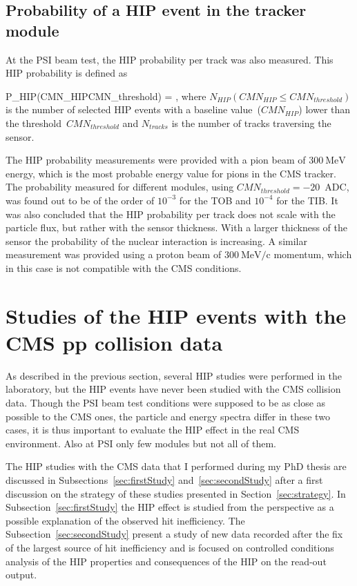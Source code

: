 \subsection{Probability of a HIP event in the tracker module~\label{sec:ProbPast}}

At the PSI beam test, the HIP probability per track was also measured. This HIP probability is defined as 

{
P_{HIP}(CMN_{HIP}\leq CMN_{threshold}) = ,
}
where $N_{HIP}(CMN_{HIP}\leq CMN_{threshold})$ is the number of selected HIP events with a baseline value~($CMN_{HIP}$) lower than the threshold~$CMN_{threshold}$ and $N_{tracks}$ is the number of tracks traversing the sensor.

The HIP probability measurements were provided with a pion beam of $300~\mathrm{MeV}$ energy, which is the most probable energy value for pions in the CMS tracker. The probability measured for different modules, using $CMN_{threshold}=-20$~ADC, was found out to be of the order of $10^{-3}$ for the TOB and $10^{-4}$ for the TIB. It was also concluded that the HIP probability per track does not scale with the particle flux, but rather with the sensor thickness. With a larger thickness of the sensor the probability of the nuclear interaction is increasing.  A similar measurement was provided using a proton beam of  $300~\mathrm{MeV/c}$ momentum, which in this case is not compatible with the CMS conditions.

\newpage

\section{Studies of the HIP events with the CMS pp collision data}

As described in the previous section, several HIP studies were performed in the laboratory, but the HIP events have never been studied with the CMS collision data. Though the PSI beam test conditions were supposed to be as close as possible to the CMS ones, the particle and energy spectra differ in these two cases, it is thus important to evaluate the HIP effect in the real CMS environment. Also at PSI only few modules but not all of them. 

The HIP studies with the CMS data that I performed during my PhD thesis are discussed in Subsections~\ref{sec:firstStudy} and~\ref{sec:secondStudy} after a first discussion on the strategy of these studies presented in Section~\ref{sec:strategy}. In Subsection~\ref{sec:firstStudy} the HIP effect is studied from the perspective as a possible explanation of the observed hit inefficiency. The Subsection~\ref{sec:secondStudy} present a study of new data recorded after the fix of the largest source of hit inefficiency and is focused on controlled conditions analysis of the HIP properties and consequences of the HIP on the read-out output.

